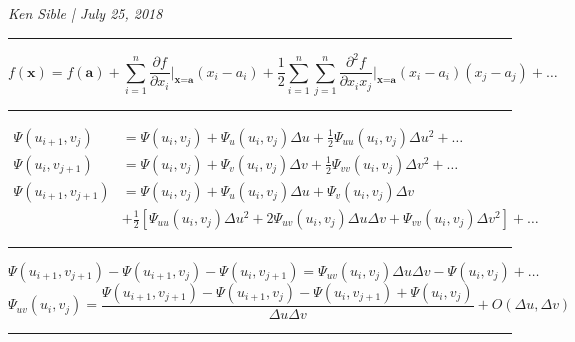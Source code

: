 \documentclass[12pt]{article}
\begin{document}

\begin{center}
    \large \textsl{Ken Sible | July 25, 2018}
\end{center}
\noindent\rule{\textwidth}{1pt}
\begin{equation*}
    f(\textbf{x})=f(\textbf{a})+\sum\limits^n_{i=1}\frac{\partial f}{\partial x_i}\bigg|_{\textbf{x}=\textbf{a}}(x_i-a_i)+\frac{1}{2}\sum\limits^n_{i=1}\sum\limits^n_{j=1}\frac{\partial^2 f}{\partial x_ix_j}\bigg|_{\textbf{x}=\textbf{a}}(x_i-a_i)(x_j-a_j)+\ldots
\end{equation*}
\noindent\rule{\textwidth}{1pt}
\begin{align*}
    \Psi(u_{i+1},v_j)&=\Psi(u_i,v_j)+\Psi_u(u_i,v_j)\Delta u+\frac{1}{2}\Psi_{uu}(u_i,v_j)\Delta u^2+\ldots\\
    \Psi(u_i,v_{j+1})&=\Psi(u_i,v_j)+\Psi_v(u_i,v_j)\Delta v+\frac{1}{2}\Psi_{vv}(u_i,v_j)\Delta v^2+\ldots\\
    \Psi(u_{i+1},v_{j+1})&=\Psi(u_i,v_j)+\Psi_u(u_i,v_j)\Delta u+\Psi_v(u_i,v_j)\Delta v\\
    &+\frac{1}{2}\left[\Psi_{uu}(u_i,v_j)\Delta u^2+2\Psi_{uv}(u_i,v_j)\Delta u\Delta v+\Psi_{vv}(u_i,v_j)\Delta v^2\right]+\ldots
\end{align*}
\noindent\rule{\textwidth}{1pt}
\begin{equation*}
    \Psi(u_{i+1},v_{j+1})-\Psi(u_{i+1},v_j)-\Psi(u_i,v_{j+1})=\Psi_{uv}(u_i,v_j)\Delta u\Delta v-\Psi(u_i,v_j)+\ldots
\end{equation*}
\begin{equation*}
    \Psi_{uv}(u_i,v_j)=\frac{\Psi(u_{i+1},v_{j+1})-\Psi(u_{i+1},v_j)-\Psi(u_i,v_{j+1})+\Psi(u_i,v_j)}{\Delta u\Delta v}+O(\Delta u,\Delta v)
\end{equation*}
\noindent\rule{\textwidth}{1pt}
\end{document}
